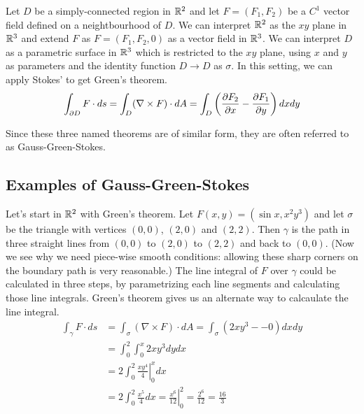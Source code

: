 \documentclass[fleqn,letterpaper]{report}
\begin{document}
\begin{thm}
Let $D$ be a simply-connected region in $\mathbb{R}^2$ and let $F =
(F_1,F_2)$ be a $C^1$ vector field defined on a neightbourhood
of $D$. We can interpret $\mathbb{R}^2$ as the $xy$ plane in
$\mathbb{R}^3$ and extend $F$ as $F = (F_1,F_2,0)$ as a vector field
in $\mathbb{R}^3$. We can interpret $D$ as a parametric surface in $\mathbb{R}^3$
which is restricted to the $xy$ plane, using $x$
and $y$ as parameters and the identity function $D \rightarrow
D$ as $\sigma$. In this setting, we can apply Stokes' to get
Green's theorem.
\begin{equation*}
\int_{\partial D} F \cdot ds = \int_D (\nabla \times F) \cdot dA
= \int_D \left( \frac{\partial F_2}{\partial x} - \frac{\partial F_1}{\partial
y} \right) dx dy 
\end{equation*}
\end{thm}

Since these three named theorems are of similar form, they are
often referred to as Gauss-Green-Stokes. 

\subsection{Examples of Gauss-Green-Stokes}
\label{gauss-green-stokes-examples}

\begin{example}
Let's start in $\mathbb{R}^2$ with Green's theorem. Let $F(x,y) =
(\sin x, x^2 y^3)$ and let $\sigma$ be the triangle with
vertices $(0,0)$, $(2,0)$ and $(2,2)$. Then $\gamma$ is the
path in three straight lines from $(0,0)$ to $(2,0)$ to
$(2,2)$ and back to $(0,0)$. (Now we see why we need piece-wise
smooth conditions: allowing these sharp corners on the
boundary path is very reasonable.) The line integral of $F$
over $\gamma$ could be calculated in three steps, by
parametrizing each line segments and calculating those line
integrals. Green's theorem gives us an alternate way to
calcaulate the line integral.
\begin{align*}
\int_\gamma F \cdot ds & = \int_\sigma (\nabla \times F) \cdot
dA = \int_\sigma ( 2xy^3 - -0) dx dy \\
& = \int_0^2 \int_0^x 2 x y^3 dy dx \\
& = 2 \int_0^2 \left. \frac{xy^4}{4} \right|_0^x dx \\
& = 2 \int_0^2 \frac{x^5}{4} dx = \left. \frac{x^6}{12}
\right|_0^2 = \frac{2^6}{12} = \frac{16}{3} 
\end{align*}
\end{example}
\end{document}

